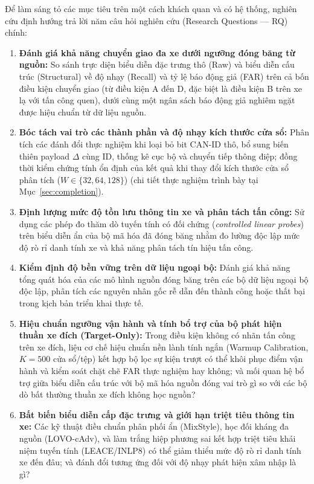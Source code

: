 \documentclass[12pt, a4paper, reqno, oneside]{book}
\begin{document}
Để làm sáng tỏ các mục tiêu trên một cách khách quan và có hệ thống, nghiên cứu định hướng trả lời năm câu hỏi nghiên cứu (Research Questions --- RQ) chính:
\begin{enumerate}[label=\textbf{RQ\arabic*:}, leftmargin=*]
    \item \textbf{Đánh giá khả năng chuyển giao đa xe dưới ngưỡng đóng băng từ nguồn:} So sánh trực diện biểu diễn đặc trưng thô (Raw) và biểu diễn cấu trúc (Structural) về độ nhạy (Recall) và tỷ lệ báo động giả (FAR) trên cả bốn điều kiện chuyển giao (từ điều kiện A đến D, đặc biệt là điều kiện B trên xe lạ với tấn công quen), dưới cùng một ngân sách báo động giả nghiêm ngặt được hiệu chuẩn từ dữ liệu nguồn.
    \item \textbf{Bóc tách vai trò các thành phần và độ nhạy kích thước cửa sổ:} Phân tích các đánh đổi thực nghiệm khi loại bỏ bit CAN-ID thô, bổ sung biến thiên payload $\Delta$ cùng ID, thống kê cục bộ và chuyển tiếp thông điệp; đồng thời kiểm chứng tính ổn định của kết quả khi thay đổi kích thước cửa sổ phân tích ($W \in \{32, 64, 128\}$) (chi tiết thực nghiệm trình bày tại Mục~\ref{sec:completion}).
    \item \textbf{Định lượng mức độ tồn lưu thông tin xe và phân tách tấn công:} Sử dụng các phép đo thăm dò tuyến tính có đối chứng (\textit{controlled linear probes}) trên biểu diễn ẩn của bộ mã hóa đã đóng băng nhằm đo lường độc lập mức độ rò rỉ danh tính xe và khả năng phân tách tín hiệu tấn công.
    \item \textbf{Kiểm định độ bền vững trên dữ liệu ngoại bộ:} Đánh giá khả năng tổng quát hóa của các mô hình nguồn đóng băng trên các bộ dữ liệu ngoại bộ độc lập, phân tích các nguyên nhân gốc rễ dẫn đến thành công hoặc thất bại trong kịch bản triển khai thực tế.
    \item[\textbf{RQ5a:}] \textbf{Hiệu chuẩn ngưỡng vận hành và tính bổ trợ của bộ phát hiện thuần xe đích (Target-Only):} Trong điều kiện không có nhãn tấn công trên xe đích, liệu cơ chế hiệu chuẩn nền lành tính ngắn (Warmup Calibration, $K=500$ cửa sổ/tệp) kết hợp bộ lọc sự kiện trượt có thể khôi phục điểm vận hành và kiểm soát chặt chẽ FAR thực nghiệm hay không; và mối quan hệ bổ trợ giữa biểu diễn cấu trúc với bộ mã hóa nguồn đóng vai trò gì so với các bộ dò bất thường thuần xe đích không học nguồn?
    \item[\textbf{RQ5b:}] \textbf{Bất biến biểu diễn cấp đặc trưng và giới hạn triệt tiêu thông tin xe:} Các kỹ thuật điều chuẩn phân phối ẩn (MixStyle), học đối kháng đa nguồn (LOVO-cAdv), và làm trắng hiệp phương sai kết hợp triệt tiêu khái niệm tuyến tính (LEACE/INLP8) có thể giảm thiểu mức độ rò rỉ danh tính xe đến đâu; và đánh đổi tương ứng đối với độ nhạy phát hiện xâm nhập là gì?
\end{enumerate}
\end{document}
